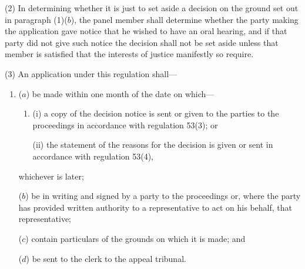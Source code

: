 \documentclass[12pt,a4paper]{article}
\begin{document}
(2) In determining whether it is just to set aside a decision on the ground set out in paragraph (1)($b$), the panel member shall determine whether the party making the application gave notice that he wished to have an oral hearing, and if that party did not give such notice the decision shall not be set aside unless 
that member is satisfied that the interests of justice manifestly so require.


%
%
%
%

(3) An application under this regulation shall—
\begin{enumerate}\item[]
($a$) be made within one month of the date on which—
\begin{enumerate}\item[]
(i) a copy of the decision notice is sent or given to the parties to the proceedings in accordance with regulation 53(3); or

(ii) the statement of the reasons for the decision is given or sent in accordance with regulation 53(4),
\end{enumerate}
whichever is later;

($b$) be in writing and signed by a party to the proceedings or, where the party has provided written authority to a representative to act on his behalf, that representative;

($c$) contain particulars of the grounds on which it is made; and

($d$) be sent to the clerk to the appeal tribunal.
\end{enumerate}
\end{document}
